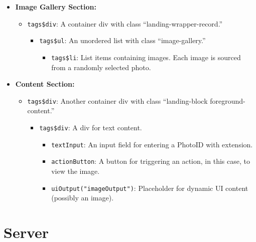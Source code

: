 \documentclass[
]{book}
\providecommand{\tightlist}{%
  \setlength{\itemsep}{0pt}\setlength{\parskip}{0pt}}
\begin{document}
\begin{itemize}
\tightlist
\item
  \textbf{Image Gallery Section:}

  \begin{itemize}
  \tightlist
  \item
    \texttt{tags\$div}: A container div with class ``landing-wrapper-record.''

    \begin{itemize}
    \tightlist
    \item
      \texttt{tags\$ul}: An unordered list with class ``image-gallery.''

      \begin{itemize}
      \tightlist
      \item
        \texttt{tags\$li}: List items containing images. Each image is sourced from a randomly selected photo.
      \end{itemize}
    \end{itemize}
  \end{itemize}
\item
  \textbf{Content Section:}

  \begin{itemize}
  \tightlist
  \item
    \texttt{tags\$div}: Another container div with class ``landing-block foreground-content.''

    \begin{itemize}
    \tightlist
    \item
      \texttt{tags\$div}: A div for text content.

      \begin{itemize}
      \tightlist
      \item
        \texttt{textInput}: An input field for entering a PhotoID with extension.
      \item
        \texttt{actionButton}: A button for triggering an action, in this case, to view the image.
      \item
        \texttt{uiOutput("imageOutput")}: Placeholder for dynamic UI content (possibly an image).
      \end{itemize}
    \end{itemize}
  \end{itemize}
\end{itemize}

\hypertarget{server}{%
\chapter{Server}\label{server}}
\end{document}
